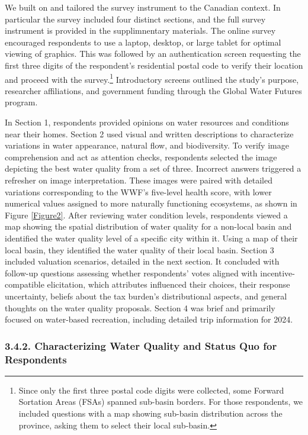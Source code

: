 \documentclass[12pt]{article}
\begin{document}
We built on \textcite{vossler2023valuing} and tailored the survey instrument to the Canadian context. In particular the survey included four 
distinct sections, and the full survey instrument is provided in the supplimnentary materials. The online survey encouraged respondents
to use a laptop, desktop, or large tablet for optimal viewing of graphics. This was followed by an authentication screen requesting the first 
three digits of the respondent’s residential postal code to verify their location and proceed with the survey.\footnote{Since only the first 
three postal code digits were collected, some Forward Sortation Areas (FSAs) spanned sub-basin borders. For those respondents, we included 
questions with a map showing sub-basin distribution across the province, asking them to select their local sub-basin.} Introductory screens 
outlined the study’s purpose, researcher affiliations, and government funding through the Global Water Futures program. 

In Section 1, respondents provided opinions on water resources and conditions near their homes. Section 2 used visual and written descriptions to characterize variations 
in water appearance, natural flow, and biodiversity. To verify image comprehension and act as attention checks, respondents selected the image 
depicting the best water quality from a set of three. Incorrect answers triggered a refresher on image interpretation. These images were paired 
with detailed variations corresponding to the WWF's five-level health score, with lower numerical values assigned to more naturally functioning 
ecosystems, as shown in Figure \ref{Figure2}. After reviewing water condition levels, respondents viewed a map showing the spatial distribution of water 
quality for a non-local basin and identified the water quality level of a specific city within it. Using a map of their local basin, they 
identified the water quality of their local basin. Section 3 included valuation scenarios, detailed in the next section. It concluded with 
follow-up questions assessing whether respondents’ votes aligned with incentive-compatible elicitation, which attributes influenced their 
choices, their response uncertainty, beliefs about the tax burden’s distributional aspects, and general thoughts on the water quality proposals. 
Section 4 was brief and primarily focused on water-based recreation, including detailed trip information for 2024.



\subsubsection*{3.4.2. Characterizing Water Quality and Status Quo for Respondents}
\end{document}

